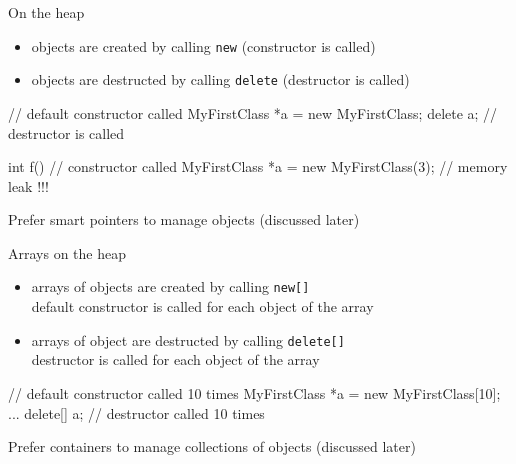 \begin{frame}[fragile]
  \begin{block}{On the heap}
    \begin{itemize}
    \item objects are created by calling \texttt{new} (constructor is called)
    \item objects are destructed by calling \texttt{delete} (destructor is called)
    \end{itemize}
  \end{block}
  \begin{cppcode}
    {
      // default constructor called
      MyFirstClass *a = new MyFirstClass;
      delete a; // destructor is called
    }

    int f() {
      // constructor called
      MyFirstClass *a = new MyFirstClass(3);
    } // memory leak !!!
  \end{cppcode}
  \begin{alertblock}{}
    Prefer smart pointers to manage objects (discussed later)
  \end{alertblock}
\end{frame}

\begin{frame}[fragile]
  \begin{block}{Arrays on the heap}
    \begin{itemize}
    \item arrays of objects are created by calling \texttt{new[]} \\
      default constructor is called for each object of the array
    \item arrays of object are destructed by calling \texttt{delete[]} \\
      destructor is called for each object of the array
    \end{itemize}
  \end{block}
  \begin{cppcode}
    {
      // default constructor called 10 times
      MyFirstClass *a = new MyFirstClass[10];
      ...
      delete[] a; // destructor called 10 times
    }
  \end{cppcode}
  \begin{alertblock}{}
    Prefer containers to manage collections of objects (discussed later)
  \end{alertblock}
\end{frame}
